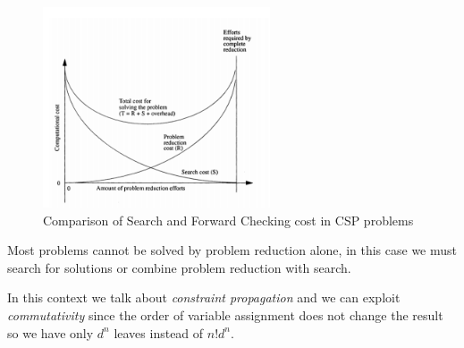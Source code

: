 \begin{figure}
	\centering
	\includegraphics[width=0.6\textwidth]{Images/searchCost}
	\caption{Comparison of Search and Forward Checking cost in CSP problems}
	\label{img:reductionCost}
\end{figure}

Most problems cannot be solved by problem reduction alone, in this case we must
search for solutions or combine problem reduction with search.

In this context we talk about \emph{constraint propagation} and we can exploit
\emph{commutativity} since the order of variable assignment does not change
the result so we have only $d^n$ leaves instead of $n!d^n$.

